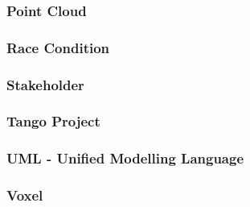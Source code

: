 \subsubsection{Point Cloud} 

\subsubsection{Race Condition}

\subsubsection{Stakeholder}

\subsubsection{Tango Project}

\subsubsection{UML - Unified Modelling Language}

\subsubsection{Voxel}